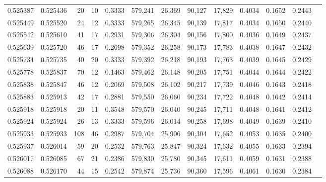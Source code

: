 \begin{tabular}{rrrrrrrrrrrrr}
0.525387 & 0.525436 &    20 &    10 &                                     0.3333 & 579,241 &  26,369 &  90,127 &  17,829 & 0.4034 & 0.1652 & 0.2443 \\
0.525449 & 0.525520 &    24 &    12 &                                     0.3333 & 579,265 &  26,345 &  90,139 &  17,817 & 0.4034 & 0.1650 & 0.2440 \\
0.525542 & 0.525610 &    41 &    17 &                                     0.2931 & 579,306 &  26,304 &  90,156 &  17,800 & 0.4036 & 0.1649 & 0.2437 \\
0.525639 & 0.525720 &    46 &    17 &                                     0.2698 & 579,352 &  26,258 &  90,173 &  17,783 & 0.4038 & 0.1647 & 0.2432 \\
0.525734 & 0.525735 &    40 &    20 &                                     0.3333 & 579,392 &  26,218 &  90,193 &  17,763 & 0.4039 & 0.1645 & 0.2429 \\
0.525778 & 0.525837 &    70 &    12 &                                     0.1463 & 579,462 &  26,148 &  90,205 &  17,751 & 0.4044 & 0.1644 & 0.2422 \\
0.525838 & 0.525847 &    46 &    12 &                                     0.2069 & 579,508 &  26,102 &  90,217 &  17,739 & 0.4046 & 0.1643 & 0.2418 \\
0.525883 & 0.525913 &    42 &    17 &                                     0.2881 & 579,550 &  26,060 &  90,234 &  17,722 & 0.4048 & 0.1642 & 0.2414 \\
0.525918 & 0.525918 &    20 &    11 &                                     0.3548 & 579,570 &  26,040 &  90,245 &  17,711 & 0.4048 & 0.1641 & 0.2412 \\
0.525924 & 0.525924 &    26 &    13 &                                     0.3333 & 579,596 &  26,014 &  90,258 &  17,698 & 0.4049 & 0.1639 & 0.2410 \\
0.525933 & 0.525933 &   108 &    46 &                                     0.2987 & 579,704 &  25,906 &  90,304 &  17,652 & 0.4053 & 0.1635 & 0.2400 \\
0.525937 & 0.526014 &    59 &    20 &                                     0.2532 & 579,763 &  25,847 &  90,324 &  17,632 & 0.4055 & 0.1633 & 0.2394 \\
0.526017 & 0.526085 &    67 &    21 &                                     0.2386 & 579,830 &  25,780 &  90,345 &  17,611 & 0.4059 & 0.1631 & 0.2388 \\
0.526088 & 0.526170 &    44 &    15 &                                     0.2542 & 579,874 &  25,736 &  90,360 &  17,596 & 0.4061 & 0.1630 & 0.2384 \\

\end{tabular}
